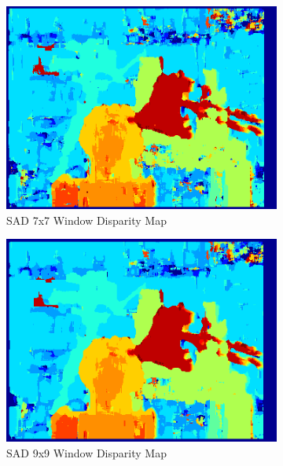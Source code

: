 \begin{figure}
\begin{center}
\begin{subfigure}{0.45\textwidth}
		\includegraphics[width=\textwidth]{figures/sad_tsukuba_7x7_0-15.png}
		\caption{SAD 7x7 Window Disparity Map}
		\label{fig:tsukuba7x7}
	\end{subfigure}
	\begin{subfigure}{0.45\textwidth}
		\includegraphics[width=\textwidth]{figures/sad_tsukuba_9x9_0-15.png}
		\caption{SAD 9x9 Window Disparity Map}
		\label{fig:tsukuba9x9}
	\end{subfigure}
	\\
	\begin{subfigure}{0.45\textwidth}

\end{subfigure}
\end{center}
\end{figure}
